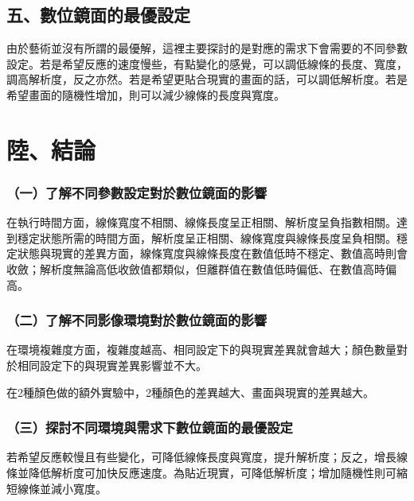 \documentclass[12pt]{article}
\begin{document}
\subsection{五、數位鏡面的最優設定}

由於藝術並沒有所謂的最優解，這裡主要探討的是對應的需求下會需要的不同參數設定。若是希望反應的速度慢些，有點變化的感覺，可以調低線條的長度、寬度，調高解析度，反之亦然。若是希望更貼合現實的畫面的話，可以調低解析度。若是希望畫面的隨機性增加，則可以減少線條的長度與寬度。

\newpage
\section{陸、結論}

\subsubsection{（一）了解不同參數設定對於數位鏡面的影響}

在執行時間方面，線條寬度不相關、線條長度呈正相關、解析度呈負指數相關。達到穩定狀態所需的時間方面，解析度呈正相關、線條寬度與線條長度呈負相關。穩定狀態與現實的差異方面，線條寬度與線條長度在數值低時不穩定、數值高時則會收斂；解析度無論高低收斂值都類似，但離群值在數值低時偏低、在數值高時偏高。

\subsubsection{（二）了解不同影像環境對於數位鏡面的影響}

在環境複雜度方面，複雜度越高、相同設定下的與現實差異就會越大；顏色數量對於相同設定下的與現實差異影響並不大。

在2種顏色做的額外實驗中，2種顏色的差異越大、畫面與現實的差異越大。

\subsubsection{（三）探討不同環境與需求下數位鏡面的最優設定}

若希望反應較慢且有些變化，可降低線條長度與寬度，提升解析度；反之，增長線條並降低解析度可加快反應速度。為貼近現實，可降低解析度；增加隨機性則可縮短線條並減小寬度。

\newpage

\printbibliography[title=柒、參考文獻資料]
\clearpage
\end{document}
